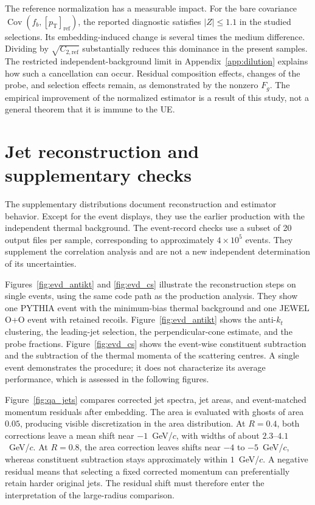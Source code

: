 \documentclass[aps,prc,twocolumn,superscriptaddress,nofootinbib,longbibliography,floatfix,10pt]{revtex4-2}
\newcommand{\mpt}{[p_{\mathrm T}]_{\mathrm{ref}}}
\newcommand{\Ctwo}{C_{2,\mathrm{ref}}}
\newcommand{\Cov}{\operatorname{Cov}}
\begin{document}
The reference normalization has a measurable impact. For the bare covariance $\Cov(f_b,\mpt)$, the reported diagnostic satisfies $|Z|\le1.1$ in the studied selections. Its embedding-induced change is several times the medium difference. Dividing by $\sqrt{\Ctwo}$ substantially reduces this dominance in the present samples. The restricted independent-background limit in Appendix~\ref{app:dilution} explains how such a cancellation can occur. Residual composition effects, changes of the probe, and selection effects remain, as demonstrated by the nonzero $F_g$. The empirical improvement of the normalized estimator is a result of this study, not a general theorem that it is immune to the UE.

\section{Jet reconstruction and supplementary checks}\label{app:qa}
The supplementary distributions document reconstruction and estimator behavior. Except for the event displays, they use the earlier production with the independent thermal background. The event-record checks use a subset of 20 output files per sample, corresponding to approximately $4\times10^5$ events. They supplement the correlation analysis and are not a new independent determination of its uncertainties.

Figures~\ref{fig:evd_antikt} and \ref{fig:evd_cs} illustrate the reconstruction steps on single events, using the same code path as the production analysis. They show one PYTHIA event with the minimum-bias thermal background and one JEWEL O+O event with retained recoils. Figure~\ref{fig:evd_antikt} shows the anti-$k_t$ clustering, the leading-jet selection, the perpendicular-cone estimate, and the probe fractions. Figure~\ref{fig:evd_cs} shows the event-wise constituent subtraction and the subtraction of the thermal momenta of the scattering centres. A single event demonstrates the procedure; it does not characterize its average performance, which is assessed in the following figures.

Figure~\ref{fig:qa_jets} compares corrected jet spectra, jet areas, and event-matched momentum residuals after embedding. The area is evaluated with ghosts of area $0.05$, producing visible discretization in the area distribution. At $R=0.4$, both corrections leave a mean shift near $-1$~GeV/$c$, with widths of about $2.3$--$4.1$~GeV/$c$. At $R=0.8$, the area correction leaves shifts near $-4$ to $-5$~GeV/$c$, whereas constituent subtraction stays approximately within $1$~GeV/$c$. A negative residual means that selecting a fixed corrected momentum can preferentially retain harder original jets. The residual shift must therefore enter the interpretation of the large-radius comparison.
\end{document}

